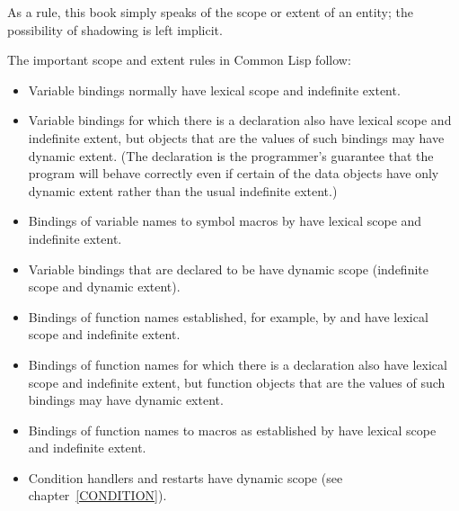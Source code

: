 As a rule, this book simply speaks of the scope or extent of an entity;
the possibility of shadowing is left implicit.

The important scope and extent rules in Common Lisp follow:
\begin{itemize}
\item
Variable bindings normally have lexical scope and indefinite extent.
\end{itemize}

\begin{newer}
\begin{itemize}
\item Variable bindings for which there is a 
declaration also have lexical scope and indefinite extent,
but objects that are the values of such bindings may have
dynamic extent.
(The declaration is the programmer's guarantee that
the program will behave correctly even if certain of the data objects have only
dynamic extent rather than the usual indefinite extent.)

\item Bindings of variable names to symbol macros by
 have lexical scope and indefinite extent.
\end{itemize}
\end{newer}

\begin{itemize}
\item
Variable bindings that are declared to be  have dynamic scope
(indefinite scope and dynamic extent).
\end{itemize}

\begin{newer}
\begin{itemize}
\item Bindings of function names established, for example, by  and
 have lexical scope and indefinite extent.

\item Bindings of function names for which there is a 
declaration also have lexical scope and indefinite extent,
but function objects that are the values of such bindings may have
dynamic extent.

\item Bindings of function names to macros as established by
 have lexical scope and indefinite extent.

\item Condition handlers and restarts have dynamic scope
(see chapter~\ref{CONDITION}).
\end{itemize}
\end{newer}

